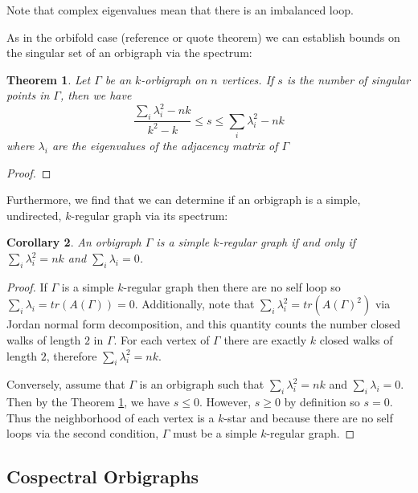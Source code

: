 \documentclass[12pt]{article}
\theoremstyle{plain}
\newtheorem{theorem}{Theorem}
\newtheorem{corollary}[theorem]{Corollary}
\theoremstyle{definition}
\theoremstyle{remark}
\begin{document}
    Note that complex eigenvalues mean that there is an imbalanced loop.

    As in the orbifold case (reference or quote theorem) we can establish bounds on the singular set of an orbigraph via the spectrum:

    \begin{theorem}\label{thm:SingularBounds}
      Let $\Gamma$ be an $k$-orbigraph on $n$ vertices. If $s$ is the number of singular points in $\Gamma$, then we have
      $$
        \frac{\sum_{i} \lambda_i^2 - n k}{k^2 - k} \le s \le \sum_{i} \lambda_i^2 - n k
      $$
      where $\lambda_i$ are the eigenvalues of the adjacency matrix of $\Gamma$
    \end{theorem}
    \begin{proof}
      
    \end{proof}

    Furthermore, we find that we can determine if an orbigraph is a simple, undirected, $k$-regular graph via its spectrum:
    \begin{corollary}
      An orbigraph $\Gamma$ is a simple $k$-regular graph if and only if $\sum_{i} \lambda_i^2 = n k$ and $\sum_{i} \lambda_i = 0$.
    \end{corollary}
    \begin{proof}
      If $\Gamma$ is a simple $k$-regular graph then there are no self loop so $\sum_{i} \lambda_i = tr(A(\Gamma)) = 0$. Additionally, note that $\sum_{i} \lambda_i^2 = tr(A(\Gamma)^2)$ via Jordan normal form decomposition, and this quantity counts the number closed walks of length $2$ in $\Gamma$. For each vertex of $\Gamma$ there are exactly $k$ closed walks of length $2$, therefore $\sum_{i} \lambda_i^2 = n k$. 

      Conversely, assume that $\Gamma$ is an orbigraph such that $\sum_{i} \lambda_i^2 = n k$ and $\sum_{i} \lambda_i = 0$. Then by the Theorem \ref{thm:SingularBounds}, we have $s \le 0$. However, $s \ge 0$ by definition so $s = 0$. Thus the neighborhood of each vertex is a $k$-star and because there are no self loops via the second condition, $\Gamma$ must be a simple $k$-regular graph.
    \end{proof}


  \subsection{Cospectral Orbigraphs}
\end{document}
